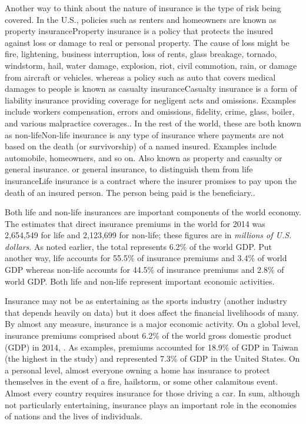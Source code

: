\documentclass[]{book}
\theoremstyle{definition}
\theoremstyle{definition}
\theoremstyle{definition}
\theoremstyle{remark}
\begin{document}
Another way to think about the nature of insurance is the type of risk
being covered. In the U.S., policies such as renters and homeowners are
known as property insurance{Property insurance is a policy that protects
the insured against loss or damage to real or personal property. The
cause of loss might be fire, lightening, business interruption, loss of
rents, glass breakage, tornado, windstorm, hail, water damage,
explosion, riot, civil commotion, rain, or damage from aircraft or
vehicles.} whereas a policy such as auto that covers medical damages to
people is known as casualty insurance{Casualty insurance is a form of
liability insurance providing coverage for negligent acts and omissions.
Examples include workers compensation, errors and omissions, fidelity,
crime, glass, boiler, and various malpractice coverages.}. In the rest
of the world, these are both known as non-life{Non-life insurance is any
type of insurance where payments are not based on the death (or
survivorship) of a named insured. Examples include automobile,
homeowners, and so on. Also known as property and casualty or general
insurance.} or general insurance, to distinguish them from life
insurance{Life insurance is a contract where the insurer promises to pay
upon the death of an insured person. The person being paid is the
beneficiary.}.

Both life and non-life insurances are important components of the world
economy. The \citet{III2016} estimates that direct insurance premiums in
the world for 2014 was 2,654,549 for life and 2,123,699 for non-life;
these figures are in \emph{millions of U.S. dollars}. As noted earlier,
the total represents 6.2\% of the world GDP. Put another way, life
accounts for 55.5\% of insurance premiums and 3.4\% of world GDP whereas
non-life accounts for 44.5\% of insurance premiums and 2.8\% of world
GDP. Both life and non-life represent important economic activities.

Insurance may not be as entertaining as the sports industry (another
industry that depends heavily on data) but it does affect the financial
livelihoods of many. By almost any measure, insurance is a major
economic activity. On a global level, insurance premiums comprised about
6.2\% of the world gross domestic product (GDP) in 2014,
\citep{III2016}. As examples, premiums accounted for 18.9\% of GDP in
Taiwan (the highest in the study) and represented 7.3\% of GDP in the
United States. On a personal level, almost everyone owning a home has
insurance to protect themselves in the event of a fire, hailstorm, or
some other calamitous event. Almost every country requires insurance for
those driving a car. In sum, although not particularly entertaining,
insurance plays an important role in the economies of nations and the
lives of individuals.
\end{document}
